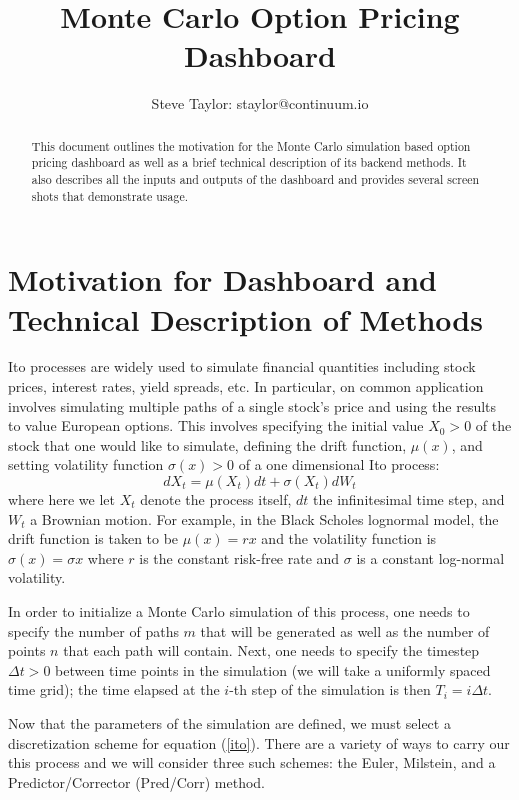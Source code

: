 \documentclass{amsart}
\title{Monte Carlo Option Pricing Dashboard}
\author{Steve Taylor: staylor@continuum.io}
\begin{document}
\maketitle
\begin{abstract}
    This document outlines the motivation for the Monte Carlo simulation based option pricing 
    dashboard as well as a brief technical description of its backend methods.
    It also describes all the inputs and outputs of the dashboard and provides several screen shots
    that demonstrate usage. 
\end{abstract}

\section{Motivation for Dashboard and Technical Description of Methods}

Ito processes are widely used to simulate financial quantities including stock prices, interest rates, 
yield spreads, etc.  In particular, on common application involves simulating multiple paths of 
a single stock's price and using the results to value European options. This involves specifying the initial value $X_0>0$ of the stock that one would like to simulate, defining the drift function, $\mu(x)$, and setting volatility function $\sigma(x)>0$ of a one dimensional Ito process:
%
\begin{equation}
    dX_t = \mu(X_t)dt + \sigma(X_t)dW_t \label{ito}
\end{equation}
% 
where here we let $X_t$ denote the process itself, $dt$ the infinitesimal time step, and 
$W_t$ a Brownian motion.  For example, in the Black Scholes lognormal model, the drift function is taken to be
$\mu(x)=rx$ and the volatility function is $\sigma(x)=\sigma x$ where $r$ is the constant risk-free 
rate and $\sigma$ is a constant log-normal volatility. 

In order to initialize a Monte Carlo simulation of this process, one needs to specify the number of paths $m$ that will be generated as well as the number of points $n$ that each path 
will contain.  Next, one needs to specify the timestep $\Delta t>0$ between time points in 
the simulation (we will take a uniformly spaced time grid); the time elapsed at the $i$-th step of the 
simulation is then $T_i=i\Delta t$.    

Now that the parameters of the simulation are defined, we must select a discretization 
scheme for equation (\ref{ito}).  There are a variety of ways to carry our this process and 
we will consider three such schemes: the Euler, Milstein, and a Predictor/Corrector (Pred/Corr) method. 
\end{document}
